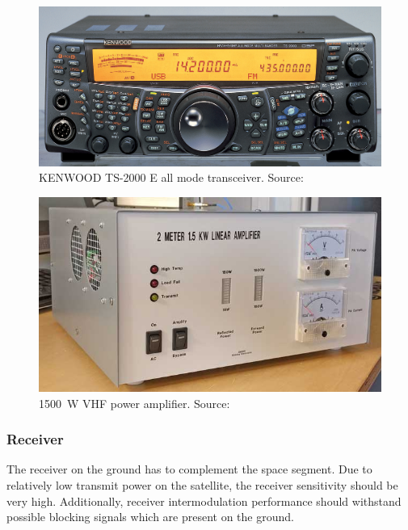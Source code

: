 \begin{minipage}{\linewidth}
    \centering
    \begin{minipage}{0.45\linewidth}
        \begin{figure}[H]
            \centering
            \includegraphics[width=0.35\paperwidth]{img/2/kenwood_ts2000.jpg}
            \caption{KENWOOD TS-2000 E all mode transceiver. Source: \cite{kenwood_ts2000}}
            \label{kenwood_ts2000}
        \end{figure}
    \end{minipage}
    \hspace{0.05\linewidth}
    \begin{minipage}{0.45\linewidth}
        \begin{figure}[H]
            \centering
            \includegraphics[width=0.35\paperwidth]{img/2/vhf_1500w_pa.jpg}
            \caption{\SI{1500}{\watt} VHF power amplifier. Source: \cite{vhf_1500w_pa}}
            \label{vhf_1500w_pa}
        \end{figure}
    \end{minipage}
\end{minipage}

\subsubsection{Receiver}
The receiver on the ground has to complement the space segment. Due to relatively low transmit power on the satellite, the receiver sensitivity should be very high. Additionally, receiver intermodulation performance should withstand possible blocking signals which are present on the ground.

